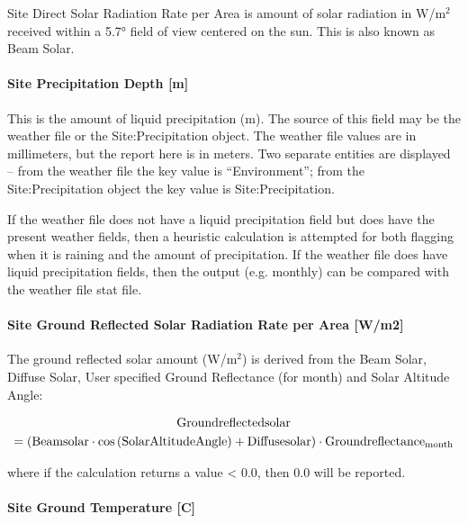 Site Direct Solar Radiation Rate per Area is amount of solar radiation in W/m\(^{2}\) received within a 5.7° field of view centered on the sun. This is also known as Beam Solar.

\paragraph{Site Precipitation Depth {[}m{]}}\label{site-precipitation-depth-m}

This is the amount of liquid precipitation (m). The source of this field may be the weather file or the Site:Precipitation object. The weather file values are in millimeters, but the report here is in meters. Two separate entities are displayed -- from the weather file the key value is ``Environment''; from the Site:Precipitation object the key value is Site:Precipitation.

If the weather file does not have a liquid precipitation field but does have the present weather fields, then a heuristic calculation is attempted for both flagging when it is raining and the amount of precipitation. If the weather file does have liquid precipitation fields, then the output (e.g. monthly) can be compared with the weather file stat file.

\paragraph{Site Ground Reflected Solar Radiation Rate per Area {[}W/m2{]}}\label{site-ground-reflected-solar-radiation-rate-per-area-wm2}

The ground reflected solar amount (W/m\(^{2}\)) is derived from the Beam Solar, Diffuse Solar, User specified Ground Reflectance (for month) and Solar Altitude Angle:

\begin{multline}
  \rm{Groundreflectedsolar}
  \\
  = \left( \rm{Beamsolar} \cdot cos \left( \rm{SolarAltitudeAngle} \right) + \rm{Diffusesolar} \right) \cdot \rm{Groundreflectance}_{\rm{month}}
\end{multline}

where if the calculation returns a value \textless{} 0.0, then 0.0 will be reported.

\paragraph{Site Ground Temperature {[}C{]}}\label{site-ground-temperature-c}

